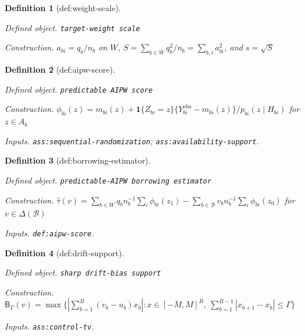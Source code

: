 \documentclass{article}
\newtheorem{definition}{Definition}
\begin{document}
\begin{definition}[def:weight-scale]\label{def:weight-scale}
\par\smallskip\noindent\emph{Defined object.} \texttt{target-\allowbreak{}weight scale}
\par\smallskip\noindent\emph{Construction.} \(a_{bi}=q_b/n_b\) on \(W\), \(S=\sum_{b\in W}q_b^2/n_b=\sum_{b,i}a_{bi}^2\), and \(s=\sqrt S\)
\end{definition}

\begin{definition}[def:aipw-score]\label{def:aipw-score}
\par\smallskip\noindent\emph{Defined object.} \texttt{predictable AIPW score}
\par\smallskip\noindent\emph{Construction.} \(\phi_{bi}(z)=m_{bi}(z)+\mathbf 1\{Z_{bi}=z\}\{Y^{\mathrm{obs}}_{bi}-m_{bi}(z)\}/p_{bi}(z\mid H_{bi})\) for \(z\in A_b\)
\par\smallskip\noindent\emph{Inputs.} \texttt{ass:\allowbreak{}sequential-\allowbreak{}randomization}; \texttt{ass:\allowbreak{}availability-\allowbreak{}support}.
\end{definition}

\begin{definition}[def:borrowing-estimator]\label{def:borrowing-estimator}
\par\smallskip\noindent\emph{Defined object.} \texttt{predictable-\allowbreak{}AIPW borrowing estimator}
\par\smallskip\noindent\emph{Construction.} \(\widehat\tau(v)=\sum_{b\in W}q_b n_b^{-1}\sum_i\phi_{bi}(z_1)-\sum_{b\in\mathcal B}v_b n_b^{-1}\sum_i\phi_{bi}(z_0)\) for \(v\in\Delta(\mathcal B)\)
\par\smallskip\noindent\emph{Inputs.} \texttt{def:\allowbreak{}aipw-\allowbreak{}score}.
\end{definition}

\begin{definition}[def:drift-support]\label{def:drift-support}
\par\smallskip\noindent\emph{Defined object.} \texttt{sharp drift-\allowbreak{}bias support}
\par\smallskip\noindent\emph{Construction.} \(\mathsf B_\Gamma(v)=\max\{|\sum_{b=1}^B(v_b-u_b)x_b|:x\in[-M,M]^B,\ \sum_{b=1}^{B-1}|x_{b+1}-x_b|\le\Gamma\}\)
\par\smallskip\noindent\emph{Inputs.} \texttt{ass:\allowbreak{}control-\allowbreak{}tv}.
\end{definition}
\end{document}
